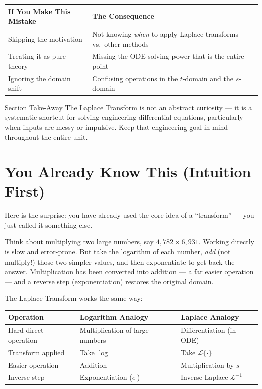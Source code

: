 \documentclass[12pt,a4paper]{article}
\begin{document}
\medskip
\begin{center}
\begin{tabular}{@{}ll@{}}
\toprule
\textbf{If You Make This Mistake} & \textbf{The Consequence} \\
\midrule
Skipping the motivation &
  Not knowing \emph{when} to apply Laplace transforms vs.\ other methods \\
Treating it as pure theory &
  Missing the ODE-solving power that is the entire point \\
Ignoring the domain shift &
  Confusing operations in the $t$-domain and the $s$-domain \\
\bottomrule
\end{tabular}
\end{center}

\begin{learnbox}{Section Take-Away}
The Laplace Transform is not an abstract curiosity --- it is a systematic
shortcut for solving engineering differential equations, particularly when
inputs are messy or impulsive.  Keep that engineering goal in mind throughout
the entire unit.
\end{learnbox}

\section{You Already Know This (Intuition First)}

Here is the surprise: you have already used the core idea of a ``transform''
--- you just called it something else.

Think about multiplying two large numbers, say $4{,}782 \times 6{,}931$.
Working directly is slow and error-prone.  But take the logarithm of each
number, \emph{add} (not multiply!) those two simpler values, and then
exponentiate to get back the answer.  Multiplication has been converted into
addition --- a far easier operation --- and a reverse step (exponentiation)
restores the original domain.

The Laplace Transform works the same way:

\begin{center}
\renewcommand{\arraystretch}{1.4}
\begin{tabular}{@{}lll@{}}
\toprule
\textbf{Operation}     & \textbf{Logarithm Analogy}       & \textbf{Laplace Analogy} \\
\midrule
Hard direct operation  & Multiplication of large numbers  & Differentiation (in ODE) \\
Transform applied      & Take $\log$                      & Take $\mathcal{L}\{\cdot\}$ \\
Easier operation       & Addition                         & Multiplication by $s$ \\
Inverse step           & Exponentiation ($e^{\cdot}$)     & Inverse Laplace $\mathcal{L}^{-1}$ \\
\bottomrule
\end{tabular}
\end{center}
\end{document}
